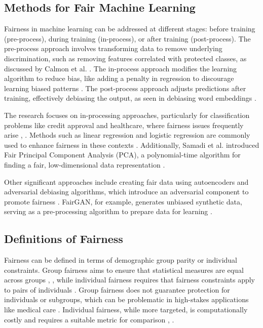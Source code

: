 \documentclass[conference]{IEEEtran}
\begin{document}
\subsection{Methods for Fair Machine Learning}

Fairness in machine learning can be addressed at different stages: before training (pre-process), during training (in-process), or after training (post-process). The pre-process approach involves transforming data to remove underlying discrimination, such as removing features correlated with protected classes, as discussed by Calmon et al. \cite{calmon2017optimized}. The in-process approach modifies the learning algorithm to reduce bias, like adding a penalty in regression to discourage learning biased patterns \cite{berk2017convex}. The post-process approach adjusts predictions after training, effectively debiasing the output, as seen in debiasing word embeddings \cite{bolukbasi2016man}.

The research focuses on in-processing approaches, particularly for classification problems like credit approval and healthcare, where fairness issues frequently arise \cite{zafar2017fairness}, \cite{wu2018fairness}. Methods such as linear regression and logistic regression are commonly used to enhance fairness in these contexts \cite{berk2017convex}. Additionally, Samadi et al. introduced Fair Principal Component Analysis (PCA), a polynomial-time algorithm for finding a fair, low-dimensional data representation \cite{samadi2018fair}.

Other significant approaches include creating fair data using autoencoders \cite{jaiswal2018unsupervised} and adversarial debiasing algorithms, which introduce an adversarial component to promote fairness \cite{zhang2018mitigating}. FairGAN, for example, generates unbiased synthetic data, serving as a pre-processing algorithm to prepare data for learning \cite{xu2018fairgan}.

\subsection{Definitions of Fairness}
Fairness can be defined in terms of demographic group parity or individual constraints. Group fairness aims to ensure that statistical measures are equal across groups \cite{dwork2012fairness}, \cite{kamishima2011fairness}, while individual fairness requires that fairness constraints apply to pairs of individuals \cite{kusner2017counterfactual}. Group fairness does not guarantee protection for individuals or subgroups, which can be problematic in high-stakes applications like medical care \cite{diana2021minimax}. Individual fairness, while more targeted, is computationally costly and requires a suitable metric for comparison \cite{chouldechova2018frontiers}, \cite{kearns2018preventing}.
\end{document}
